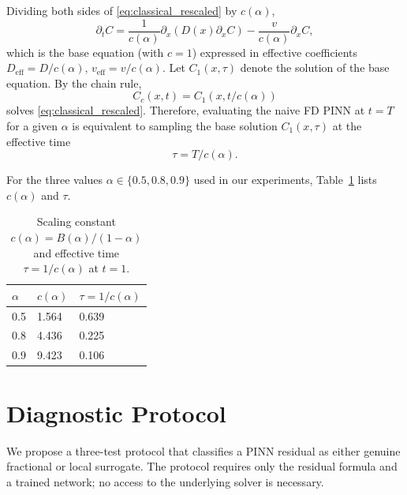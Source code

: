 \documentclass[11pt]{article}
\begin{document}
Dividing both sides of \eqref{eq:classical_rescaled} by \(c(\alpha)\),
\begin{equation}
\partial_t C = \frac{1}{c(\alpha)}\partial_x(D(x)\partial_x C) - \frac{v}{c(\alpha)}\partial_x C,
\end{equation}
which is the base equation (with \(c=1\)) expressed in effective coefficients \(D_{\mathrm{eff}} = D/c(\alpha)\), \(v_{\mathrm{eff}} = v/c(\alpha)\). Let \(C_1(x,\tau)\) denote the solution of the base equation. By the chain rule,
\begin{equation}
C_c(x,t) = C_1\!\left(x, t/c(\alpha)\right)
\label{eq:eff_time}
\end{equation}
solves \eqref{eq:classical_rescaled}. Therefore, evaluating the naive FD PINN at \(t=T\) for a given \(\alpha\) is equivalent to sampling the base solution \(C_1(x,\tau)\) at the effective time
\begin{equation}
\tau = T/c(\alpha).
\label{eq:tau}
\end{equation}

For the three values \(\alpha \in \{0.5, 0.8, 0.9\}\) used in our experiments, Table~\ref{tab:tau} lists \(c(\alpha)\) and \(\tau\).

\begin{table}[h]
\centering
\caption{Scaling constant \(c(\alpha) = B(\alpha)/(1-\alpha)\) and effective time \(\tau = 1/c(\alpha)\) at \(t=1\).}
\label{tab:tau}
\begin{tabular}{lll}
\toprule
\(\alpha\) & \(c(\alpha)\) & \(\tau = 1/c(\alpha)\) \\
\midrule
0.5 & 1.564 & 0.639 \\
0.8 & 4.436 & 0.225 \\
0.9 & 9.423 & 0.106 \\
\bottomrule
\end{tabular}
\end{table}

\section{Diagnostic Protocol}
\label{sec:protocol}

We propose a three-test protocol that classifies a PINN residual as either genuine fractional or local surrogate. The protocol requires only the residual formula and a trained network; no access to the underlying solver is necessary.
\end{document}
